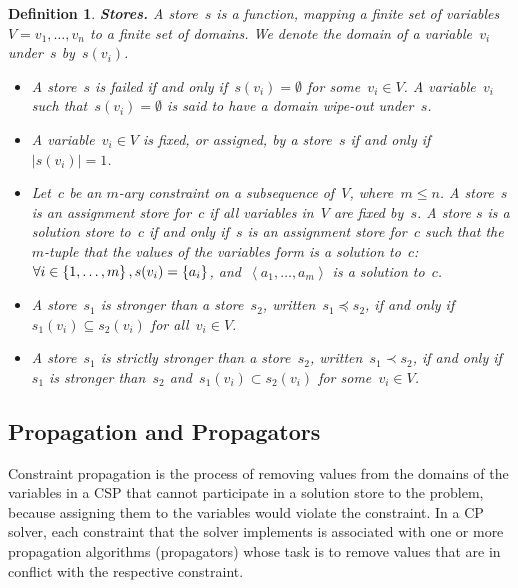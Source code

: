 \documentclass[a4paper,11pt]{article}
\newtheorem{definition}{Definition}
\newcommand{\Dom}[1]{\text{dom}({#1})}
\numberwithin{equation}{section}
\begin{document}
\begin{definition}
  \textbf{Stores.} A \emph{store}~$s$ is a function, mapping a finite set of
  variables~$V = v_1, \ldots, v_n$ to a finite set of domains. We denote the domain of
  a variable~$v_i$ under~$s$ by~$s(v_i)$.%
  \begin{itemize}
    \item A store~$s$ is \emph{failed} if and only if~$s(v_i) = \emptyset$ for some~$v_i \in V$.
      A variable~$v_i$ such that~$s(v_i) = \emptyset$ is said to have 
      a \emph{domain wipe-out} under~$s$.
    
    \item   A variable~$v_i \in V$ is \emph{fixed}, or \emph{assigned},
      by a store~$s$ if and only if~$|s(v_i)| = 1$. 
    
    \item Let~$c$ be an $m$-ary constraint on a subsequence of~$V$,
      where~$m \leq n$.
      A store~$s$ is an \emph{assignment store} for~$c$ if all variables
      in~$V$ are fixed by~$s$.
      A store $s$ is a \emph{solution store} 
      to~$c$ if and only if~$s$ is an assignment store for~$c$ such that
      the~$m$-tuple that the values of the variables form is a solution
      to~$c$:
      $\forall i \in \left\{1,\ldots,m\right\}, s(v_i) = \left\{a_i\right\}$,
      and~$\left<a_1,\ldots,a_m\right>$ is a solution to~$c$.

    \item A store~$s_1$ is \emph{stronger} than a store~$s_2$, 
      written~$s_1 \preceq s_2$, if and only if~$s_1(v_i) \subseteq s_2(v_i)$ 
      for all~$v_i \in V$.
    
    \item A store~$s_1$ is \emph{strictly stronger} than a store~$s_2$, 
      written~$s_1 \prec s_2$, if and only if~$s_1$ is stronger than~$s_2$
      and~$s_1(v_i) \subset s_2(v_i)$ for some~$v_i \in V$. 
      
  \end{itemize}

\end{definition}

\subsection{Propagation and Propagators}
\label{bg:propagation}

Constraint propagation is the process of removing values from the domains
of the variables in a CSP that cannot participate in a solution store to the 
problem, because assigning them to the variables would violate the constraint.
In a CP solver, each constraint that the solver implements is 
associated with 
one or more propagation algorithms (propagators) whose task is to remove
values that are in conflict with the respective constraint.
\end{document}
